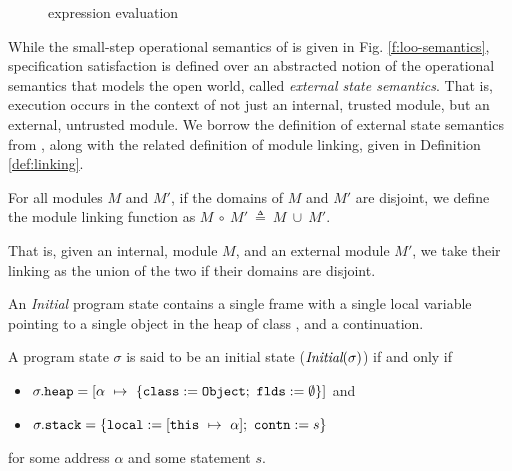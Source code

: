 \begin{figure}[t]
\begin{minipage}{\textwidth}
\begin{minipage}{\textwidth}
\caption{\Loo expression evaluation}
\label{f:evaluation}
\end{minipage}
\end{minipage}
\end{figure}

While the small-step operational semantics of \Loo is given in Fig. \ref{f:loo-semantics},
specification satisfaction is defined over an abstracted notion of 
the operational semantics that models the open world, called \emph{external state semantics}. 
That is, execution occurs in the context of not just an internal, trusted module, but 
an external, untrusted module. We borrow the definition of external state semantics 
from \citeauthor{FASE}, along with the related definition of module linking, given in Definition \ref{def:linking}.
\begin{definition}
\label{def:linking}
For all modules $M$ and $M'$, if the domains of $M$ and $M'$ are disjoint, 
we define the module linking function as $M\ \circ\ M'\ \triangleq\ M\ \cup\ M'$.
\end{definition}
That is, given an internal, module $M$, and an external module $M'$, 
we take their linking as the union of the two if their domains are disjoint.



An \emph{Initial} program state contains a single frame 
with a single local variable  pointing to a single object 
in the heap of class , and a continuation.
\begin{definition}
\label{def:initial}
A program state $\sigma$ is said to be an initial state ($\textit{Initial}(\sigma)$)
if and only if
\begin{itemize}
\item
$\sigma.\prg{heap} = [\alpha\ \mapsto\ \{\prg{class}:=\prg{Object};\ \prg{flds}:=\emptyset\}]$ and
\item
$\sigma.{\texttt{stack}} = \{{\texttt{local}}:=[{\texttt{this}}\ \mapsto\ \alpha];\ {\texttt{contn}}:= s\}$
\end{itemize} 
for some address $\alpha$ and some statement $s$.
\end{definition}


